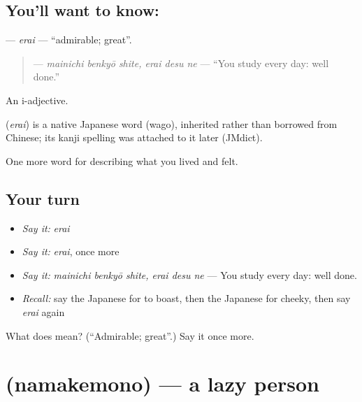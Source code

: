 \subsection*{You'll want to know: }
\textbf{} — \emph{erai} — \textquotedblleft{}admirable; great\textquotedblright{}.

\begin{quote}
\textbf{ } — \emph{mainichi benkyō shite, erai desu ne} — \textquotedblleft{}You study every day: well done.\textquotedblright{}
\end{quote}

An i-adjective.

\begin{cousinweb}
\textbf{} (\emph{erai}) is a native Japanese word (wago), inherited rather than borrowed from Chinese; its kanji spelling was attached to it later (JMdict).
\end{cousinweb}

\begin{grammarlens}[title={What you've built}]
One more word for describing what you lived and felt.
\end{grammarlens}

\subsection*{Your turn}
\begin{itemize}
\raggedright
  \item \emph{Say it:} \emph{erai}
  \item \emph{Say it:} \emph{erai}, once more
  \item \emph{Say it:} \emph{mainichi benkyō shite, erai desu ne} — You study every day: well done.
  \item \emph{Recall:} say the Japanese for to boast, then the Japanese for cheeky, then say \emph{erai} again
\end{itemize}

\begin{tcolorbox}[breakable,colback=teal!4,colframe=teal!35!black,title={Before you move on}]
What does  mean? (\textquotedblleft{}Admirable; great\textquotedblright{}.) Say it once more.
\end{tcolorbox}
\section[\texorpdfstring{\ja{なまけもの} (namakemono)}{なまけもの (namakemono)}]{ (namakemono) — a lazy person}

